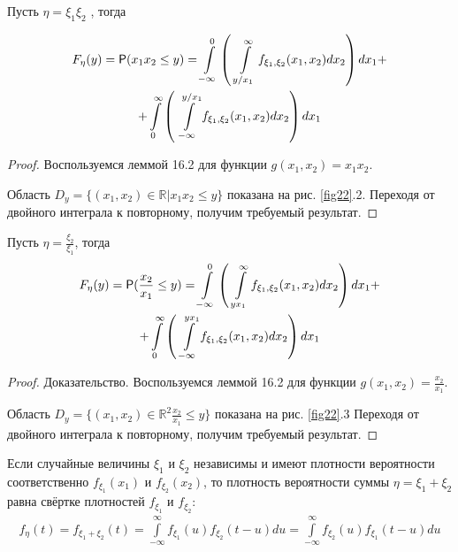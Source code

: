 \begin{lemma}
\label{lemma:16.4}
Пусть $\eta = \xi_1 \xi_2$ , тогда

\begin{gather*}
	F_\eta (y) = \P ( x_1x_2 \leq y ) =
	\int\limits_{-\infty}^{0}\left(
		\,\,\int\limits_{y/x_1}^{\infty} f_{\xi_1,\xi_2} (x_1, x_2 ) dx_2
	\right)dx_1+\\+
	\int\limits_{0}^{\infty}\left(
		\,\,\int\limits^{y/x_1}_{-\infty} f_{\xi_1,\xi_2} (x_1, x_2 ) dx_2
	\right)dx_1
\end{gather*}
\end{lemma}

\begin{proof}
	Воспользуемся леммой 16.2 для функции $g(x_1 , x_2 ) = x_1 x_2$.

Область $D_y = \{(x_1 , x_2 ) \in \mathbb{R}| x_1 x_2 \leq y\}$ показана на рис. \ref{fig22}.2. Переходя от двойного интеграла к повторному, получим требуемый результат.
\end{proof}

\begin{lemma}
\label{lemma:16.5}
Пусть $\eta = \frac{\xi_2}{\xi_1}$, тогда
\begin{gather*}
	F_\eta (y) = \P ( \frac{x_2}{x_1} \leq y ) =
	\int\limits_{-\infty}^{0}\left(
		\,\,\int\limits_{yx_1}^{\infty} f_{\xi_1,\xi_2} (x_1, x_2 ) dx_2
	\right)dx_1+\\+
	\int\limits_{0}^{\infty}\left(
		\,\,\int\limits^{yx_1}_{-\infty} f_{\xi_1,\xi_2} (x_1, x_2 ) dx_2
	\right)dx_1
\end{gather*}
\end{lemma}
\begin{proof}
Доказательство. Воспользуемся леммой 16.2 для функции $g(x_1 , x_2 ) = \frac{x_2}{x_1}$.

Область $D_y = \{(x_1 , x_2 ) \in \mathbb{R}^2  \frac{x_2}{x_1} \leq y\}$ показана на рис. \ref{fig22}.3 Переходя от двойного интеграла к повторному, получим требуемый результат.
\end{proof}

\begin{lemma}[О свёртке]
\label{lemma:16.6}
	Если случайные величины $\xi_1$ и $\xi_2$ независимы
и имеют плотности вероятности соответственно $f_{\xi_1} (x_1 )$ и $f_{\xi_2} (x_2 )$, то плотность вероятности суммы $\eta = \xi_1 + \xi_2$ равна свёртке плотностей $f_{\xi_1}$ и $f_{\xi_2}$:
\begin{gather*}
	f_\eta (t)=f_{\xi_1+\xi_2}(t)=\int\limits_{-\infty}^{\infty} f_{\xi_1} (u)f_{\xi_2} (t - u) du=
	\int\limits_{-\infty}^{\infty} f_{\xi_2}(u)f_{\xi_1} (t - u) du
\end{gather*}
\end{lemma}

